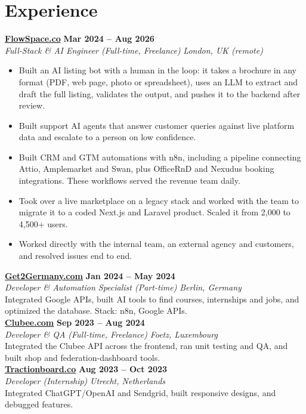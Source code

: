 \documentclass[a4paper,10pt]{article}
\newcommand{\role}[4]{%
 \textbf{#1} \hfill \textbf{#2}\\[1pt]%
 \textit{#3} \hfill \textit{#4}\\[2pt]%
}
\begin{document}
\section{Experience}

\role{\href{https://flowspace.co}{FlowSpace.co}}{Mar 2024 -- Aug 2026}{Full-Stack \& AI Engineer (Full-time, Freelance)}{London, UK (remote)}
\begin{itemize}
 \item Built an AI listing bot with a human in the loop: it takes a brochure in any format (PDF, web page, photo or spreadsheet), uses an LLM to extract and draft the full listing, validates the output, and pushes it to the backend after review.
 \item Built support AI agents that answer customer queries against live platform data and escalate to a person on low confidence.
 \item Built CRM and GTM automations with n8n, including a pipeline connecting Attio, Amplemarket and Swan, plus OfficeRnD and Nexudus booking integrations. These workflows served the revenue team daily.
 \item Took over a live marketplace on a legacy stack and worked with the team to migrate it to a coded Next.js and Laravel product. Scaled it from 2,000 to 4,500+ users.
 \item Worked directly with the internal team, an external agency and customers, and resolved issues end to end.
\end{itemize}

\role{\href{https://get2germany.com}{Get2Germany.com}}{Jan 2024 -- May 2024}{Developer \& Automation Specialist (Part-time)}{Berlin, Germany}
Integrated Google APIs, built AI tools to find courses, internships and jobs, and optimized the database. Stack: n8n, Google APIs.\\[1pt]

\role{\href{https://clubee.com}{Clubee.com}}{Sep 2023 -- Aug 2024}{Developer \& QA (Full-time, Freelance)}{Foetz, Luxembourg}
Integrated the Clubee API across the frontend, ran unit testing and QA, and built shop and federation-dashboard tools.\\[1pt]

\role{\href{https://tractionboard.co}{Tractionboard.co}}{Aug 2023 -- Oct 2023}{Developer (Internship)}{Utrecht, Netherlands}
Integrated ChatGPT/OpenAI and Sendgrid, built responsive designs, and debugged features.

\end{document}
